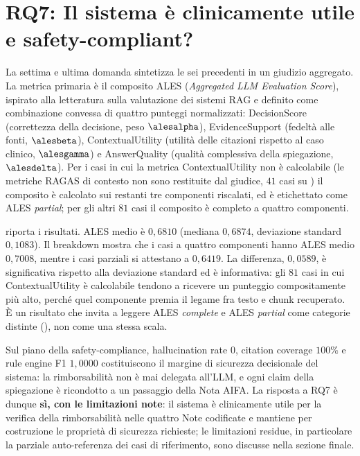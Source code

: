 \section{RQ7: Il sistema è clinicamente utile e safety-compliant?}
\label{sec:rq7}

La settima e ultima domanda sintetizza le sei precedenti in un giudizio aggregato. La metrica primaria è il composito ALES (\emph{Aggregated LLM Evaluation Score}), ispirato alla letteratura sulla valutazione dei sistemi RAG e definito come combinazione convessa di quattro punteggi normalizzati: DecisionScore (correttezza della decisione, peso $\alesalpha$), EvidenceSupport (fedeltà alle fonti, $\alesbeta$), ContextualUtility (utilità delle citazioni rispetto al caso clinico, $\alesgamma$) e AnswerQuality (qualità complessiva della spiegazione, $\alesdelta$). Per i casi in cui la metrica ContextualUtility non è calcolabile (le metriche RAGAS di contesto non sono restituite dal giudice, $41$ casi su \goldn) il composito è calcolato sui restanti tre componenti riscalati, ed è etichettato come ALES \emph{partial}; per gli altri $81$ casi il composito è completo a quattro componenti.

 riporta i risultati. ALES medio è $0{,}6810$ (mediana $0{,}6874$, deviazione standard $0{,}1083$). Il breakdown mostra che i casi a quattro componenti hanno ALES medio $0{,}7008$, mentre i casi parziali si attestano a $0{,}6419$. La differenza, $0{,}0589$, è significativa rispetto alla deviazione standard ed è informativa: gli $81$ casi in cui ContextualUtility è calcolabile tendono a ricevere un punteggio compositamente più alto, perché quel componente premia il legame fra testo e chunk recuperato. È un risultato che invita a leggere ALES \emph{complete} e ALES \emph{partial} come categorie distinte (), non come una stessa scala.

Sul piano della safety-compliance, hallucination rate $0$, citation coverage $100\%$ e rule engine F1 $1{,}0000$ costituiscono il margine di sicurezza decisionale del sistema: la rimborsabilità non è mai delegata all'LLM, e ogni claim della spiegazione è ricondotto a un passaggio della Nota AIFA. La risposta a RQ7 è dunque \textbf{sì, con le limitazioni note}: il sistema è clinicamente utile per la verifica della rimborsabilità nelle quattro Note codificate e mantiene per costruzione le proprietà di sicurezza richieste; le limitazioni residue, in particolare la parziale auto-referenza dei casi di riferimento, sono discusse nella sezione finale.

